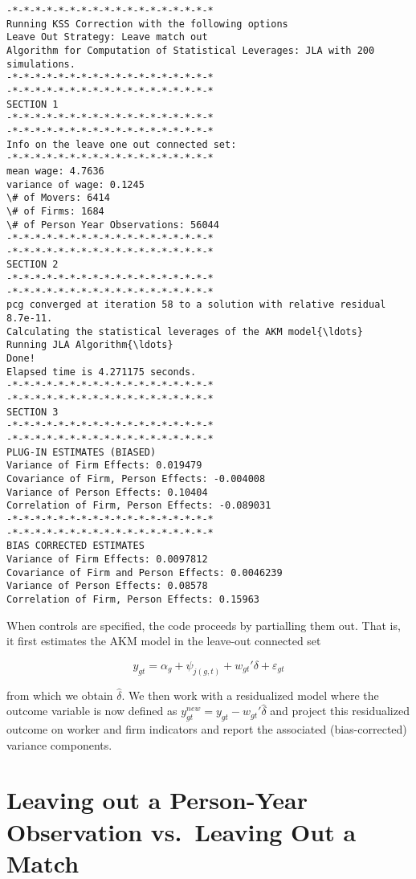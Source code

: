 \documentclass[11pt]{article}
\begin{document}
    \begin{Verbatim}[commandchars=\\\{\}]
-*-*-*-*-*-*-*-*-*-*-*-*-*-*-*-*-*-*
Running KSS Correction with the following options
Leave Out Strategy: Leave match out
Algorithm for Computation of Statistical Leverages: JLA with 200 simulations.
-*-*-*-*-*-*-*-*-*-*-*-*-*-*-*-*-*-*
-*-*-*-*-*-*-*-*-*-*-*-*-*-*-*-*-*-*
SECTION 1
-*-*-*-*-*-*-*-*-*-*-*-*-*-*-*-*-*-*
-*-*-*-*-*-*-*-*-*-*-*-*-*-*-*-*-*-*
Info on the leave one out connected set:
-*-*-*-*-*-*-*-*-*-*-*-*-*-*-*-*-*-*
mean wage: 4.7636
variance of wage: 0.1245
\# of Movers: 6414
\# of Firms: 1684
\# of Person Year Observations: 56044
-*-*-*-*-*-*-*-*-*-*-*-*-*-*-*-*-*-*
-*-*-*-*-*-*-*-*-*-*-*-*-*-*-*-*-*-*
SECTION 2
-*-*-*-*-*-*-*-*-*-*-*-*-*-*-*-*-*-*
-*-*-*-*-*-*-*-*-*-*-*-*-*-*-*-*-*-*
pcg converged at iteration 58 to a solution with relative residual 8.7e-11.
Calculating the statistical leverages of the AKM model{\ldots}
Running JLA Algorithm{\ldots}
Done!
Elapsed time is 4.271175 seconds.
-*-*-*-*-*-*-*-*-*-*-*-*-*-*-*-*-*-*
-*-*-*-*-*-*-*-*-*-*-*-*-*-*-*-*-*-*
SECTION 3
-*-*-*-*-*-*-*-*-*-*-*-*-*-*-*-*-*-*
-*-*-*-*-*-*-*-*-*-*-*-*-*-*-*-*-*-*
PLUG-IN ESTIMATES (BIASED)
Variance of Firm Effects: 0.019479
Covariance of Firm, Person Effects: -0.004008
Variance of Person Effects: 0.10404
Correlation of Firm, Person Effects: -0.089031
-*-*-*-*-*-*-*-*-*-*-*-*-*-*-*-*-*-*
-*-*-*-*-*-*-*-*-*-*-*-*-*-*-*-*-*-*
BIAS CORRECTED ESTIMATES
Variance of Firm Effects: 0.0097812
Covariance of Firm and Person Effects: 0.0046239
Variance of Person Effects: 0.08578
Correlation of Firm, Person Effects: 0.15963
    \end{Verbatim}

    When controls are specified, the code proceeds by partialling them out.
That is, it first estimates the AKM model in the leave-out connected set

\begin{equation}
y_{gt}=\alpha_{g}+\psi_{j(g,t)}+w_{gt}'\delta+\varepsilon_{gt}
\end{equation}

from which we obtain \(\hat{\delta}\). We then work with a residualized
model where the outcome variable is now defined as
\(y_{gt}^{new}=y_{gt}-w_{gt}'\hat{\delta}\) and project this
residualized outcome on worker and firm indicators and report the
associated (bias-corrected) variance components.

    \hypertarget{leaving-out-a-person-year-observation-vs.-leaving-out-a-match}{%
\section{Leaving out a Person-Year Observation vs.~Leaving Out a
Match}\label{leaving-out-a-person-year-observation-vs.-leaving-out-a-match}}
\end{document}
